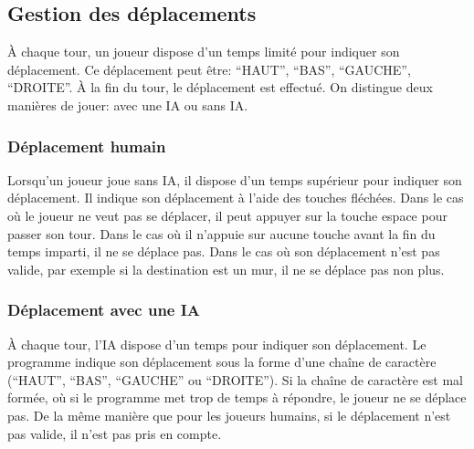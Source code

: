 	\subsection{Gestion des déplacements}
	\label{subsec:gestion_deplacements}
	À chaque tour, un joueur dispose d'un temps limité pour indiquer son déplacement. Ce déplacement peut être: ``HAUT'', ``BAS'', ``GAUCHE'', ``DROITE''. À la fin du tour, le déplacement est effectué. On distingue deux manières de jouer: avec une IA ou sans IA\@.

	\subsubsection*{Déplacement humain}
	Lorsqu'un joueur joue sans IA, il dispose d'un temps supérieur pour indiquer son déplacement. Il indique son déplacement à l'aide des touches fléchées. Dans le cas où le joueur ne veut pas se déplacer, il peut appuyer sur la touche espace pour passer son tour. Dans le cas où il n'appuie sur aucune touche avant la fin du temps imparti, il ne se déplace pas. Dans le cas où son déplacement n'est pas valide, par exemple si la destination est un mur, il ne se déplace pas non plus.

	\subsubsection*{Déplacement avec une IA}
	À chaque tour, l'IA dispose d'un temps pour indiquer son déplacement. Le programme indique son déplacement sous la forme d'une chaîne de caractère (``HAUT'', ``BAS'', ``GAUCHE'' ou ``DROITE''). Si la chaîne de caractère est mal formée, où si le programme met trop de temps à répondre, le joueur ne se déplace pas. De la même manière que pour les joueurs humains, si le déplacement n'est pas valide, il n'est pas pris en compte.
